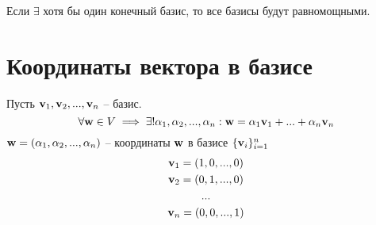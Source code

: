\documentclass[main]{subfiles}
\begin{document}
Если $\exists$ хотя бы один конечный базис, то все базисы будут равномощными.

\section{Координаты вектора в базисе}
Пусть $\mathbf{v}_1, \mathbf{v}_2, ..., \mathbf{v}_n$ -- базис.
\[\forall \mathbf{w} \in V \implies \exists ! \alpha_1, \alpha_2, ..., \alpha_n:
    \mathbf{w} = \alpha_1 \mathbf{v}_1 + ... + \alpha_n \mathbf{v}_n\]
$\mathbf{w} = (\alpha_1, \alpha_2, ..., \alpha_n)$ -- координаты $\mathbf{w}$ в базисе $\{\mathbf{v}_i\}_{i=1}^n$
\begin{gather*}
    \mathbf{v}_1 = (1, 0, ..., 0)\\
    \mathbf{v}_2 = (0, 1, ..., 0)\\
    ...\\
    \mathbf{v}_n = (0, 0, ..., 1)
\end{gather*}
\end{document}
